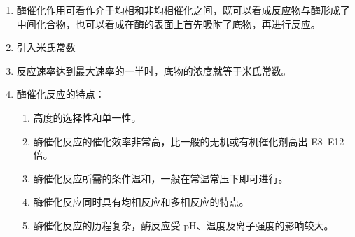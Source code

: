 \begin{enumerate}
    \item 酶催化作用可看作介于均相和非均相催化之间，既可以看成反应物与酶形成了中间化合物，也可以看成在酶的表面上首先吸附了底物，再进行反应。
    \item 引入米氏常数
    \item 反应速率达到最大速率的一半时，底物的浓度就等于米氏常数。
    \item 酶催化反应的特点：
    \begin{enumerate}
        \item 高度的选择性和单一性。
        \item 酶催化反应的催化效率非常高，比一般的无机或有机催化剂高出 \qtyrange{E8}{E12}{} 倍。
        \item 酶催化反应所需的条件温和，一般在常温常压下即可进行。
        \item 酶催化反应同时具有均相反应和多相反应的特点。
        \item 酶催化反应的历程复杂，酶反应受 $\mathrm{pH}$、温度及离子强度的影响较大。
    \end{enumerate}
\end{enumerate}